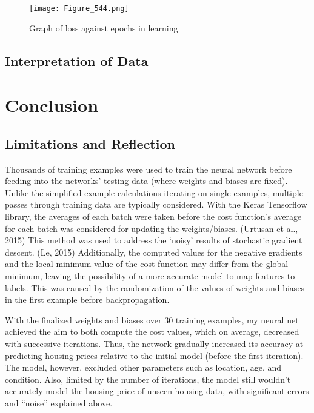 \documentclass[12pt,a4paper]{article}
\begin{document}
\begin{figure}[h]
    \centering
    \texttt{[image: Figure\_544.png]}
    \caption{Graph of loss against epochs in learning}
    \label{fig:my_label}
\end{figure}




\subsection{Interpretation of Data}

\section{Conclusion}

\subsection{Limitations and Reflection}

Thousands of training examples were used to train the neural network before feeding into the networks’ testing data (where weights and biases are fixed). Unlike the simplified example calculations iterating on single examples, multiple passes through training data are typically considered. With the Keras Tensorflow library, the averages of each batch were taken before the cost function’s average for each batch was considered for updating the weights/biases. (Urtusan et al., 2015) This method was used to address the ‘noisy’ results of stochastic gradient descent. (Le, 2015) Additionally, the computed values for the negative gradients and the local minimum value of the cost function may differ from the global minimum, leaving the possibility of a more accurate model to map features to labels. This was caused by the randomization of the values of weights and biases in the first example before backpropagation. 

With the finalized weights and biases over 30 training examples, my neural net achieved the aim to both compute the cost values, which on average, decreased with successive iterations. Thus, the network gradually increased its accuracy at predicting housing prices relative to the initial model (before the first iteration). The model, however, excluded other parameters such as location, age, and condition. Also, limited by the number of iterations, the model still wouldn’t accurately model the housing price of unseen housing data, with significant errors and “noise” explained above.
\end{document}
